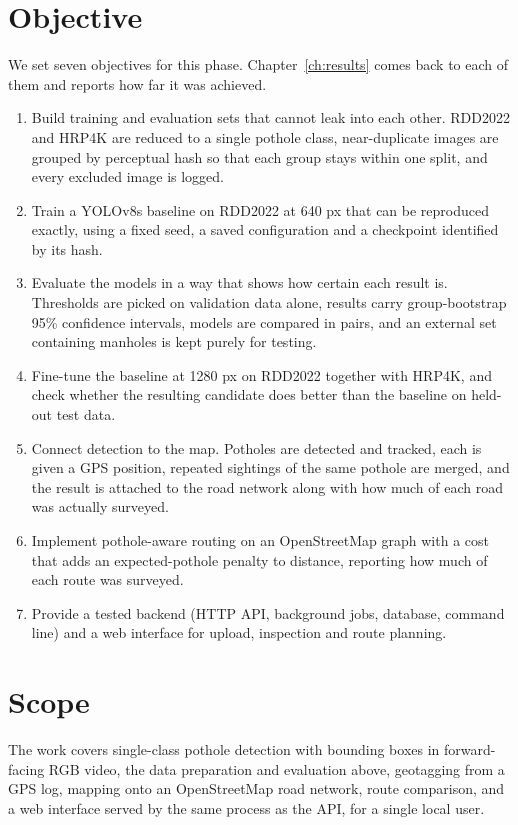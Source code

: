 \section{Objective}
We set seven objectives for this phase. Chapter~\ref{ch:results} comes back to each of them and reports how far it was achieved.
\begin{enumerate}[itemsep=0pt]
  \item \label{obj:data} Build training and evaluation sets that cannot leak into each other. RDD2022 and HRP4K are reduced to a single pothole class, near-duplicate images are grouped by perceptual hash so that each group stays within one split, and every excluded image is logged.
  \item \label{obj:baseline} Train a YOLOv8s baseline on RDD2022 at 640 px that can be reproduced exactly, using a fixed seed, a saved configuration and a checkpoint identified by its hash.
  \item \label{obj:protocol} Evaluate the models in a way that shows how certain each result is. Thresholds are picked on validation data alone, results carry group-bootstrap 95\% confidence intervals, models are compared in pairs, and an external set containing manholes is kept purely for testing.
  \item \label{obj:finetune} Fine-tune the baseline at 1280 px on RDD2022 together with HRP4K, and check whether the resulting candidate does better than the baseline on held-out test data.
  \item \label{obj:pipeline} Connect detection to the map. Potholes are detected and tracked, each is given a GPS position, repeated sightings of the same pothole are merged, and the result is attached to the road network along with how much of each road was actually surveyed.
  \item \label{obj:routing} Implement pothole-aware routing on an OpenStreetMap graph with a cost that adds an expected-pothole penalty to distance, reporting how much of each route was surveyed.
  \item \label{obj:backend} Provide a tested backend (HTTP API, background jobs, database, command line) and a web interface for upload, inspection and route planning.
\end{enumerate}

\section{Scope}
The work covers single-class pothole detection with bounding boxes in forward-facing RGB video, the data preparation and evaluation above, geotagging from a GPS log, mapping onto an OpenStreetMap road network, route comparison, and a web interface served by the same process as the API, for a single local user.

